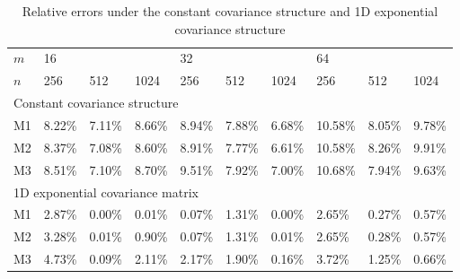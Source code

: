 \begin{table}[!h]
	\centering
	{
		\begin{tabular}{@{}llllllllll@{}}
			\toprule
			$m$ 	& \multicolumn{3}{l}{16} & \multicolumn{3}{l}{32} & \multicolumn{3}{l}{64}  \\
			$n$ 	& 256 & 512 & 1024 & 256 & 512 & 1024 & 256 & 512 & 1024 \\ \bottomrule
			
			\multicolumn{10}{l}{Constant covariance structure} \\ \midrule

			M1 & 8.22\% & 7.11\% & 8.66\% & 8.94\% & 7.88\% & 6.68\% & 10.58\% & 8.05\% & 9.78\% \\
			M2 & 8.37\% & 7.08\% & 8.60\% & 8.91\% & 7.77\% & 6.61\% & 10.58\% & 8.26\% & 9.91\% \\
			M3 & 8.51\% & 7.10\% & 8.70\% & 9.51\% & 7.92\% & 7.00\% & 10.68\% & 7.94\% & 9.63\% \\

			\midrule
			
			\multicolumn{10}{l}{1D exponential covariance matrix} \\ \midrule

			M1 & 2.87\% & 0.00\% & 0.01\% & 0.07\% & 1.31\% & 0.00\% & 2.65\% & 0.27\% & 0.57\% \\
			M2 & 3.28\% & 0.01\% & 0.90\% & 0.07\% & 1.31\% & 0.01\% & 2.65\% & 0.28\% & 0.57\% \\
			M3 & 4.73\% & 0.09\% & 2.11\% & 2.17\% & 1.90\% & 0.16\% & 3.72\% & 1.25\% & 0.66\% \\
				
			\bottomrule
		\end{tabular}%
	}
	\caption{Relative errors under the constant covariance structure and 1D exponential covariance structure}
	\label{tab:table3}
\end{table}

